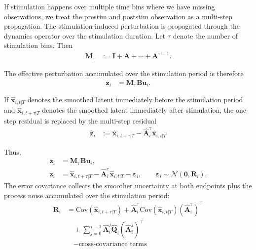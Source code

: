 \documentclass[11pt,letterpaper]{article} %
\begin{document}
If stimulation happens over multiple time bins where we have missing observations, we treat the prestim and poststim observation as a multi-step propagation. The stimulation-induced perturbation is propagated through the dynamics operator over the stimulation duration. Let $\tau$ denote the number of stimulation bins. Then
\begin{align*}
    \bm{M}_{\mathrm{\tau}}
    &:=
    \bm{I}
    + \bm{A}
    + \cdots
    + \bm{A}^{\mathrm{\tau}-1}.
\end{align*}

The effective perturbation accumulated over the stimulation period is therefore
\begin{align*}
    \bm{z}_i
    &=
    \bm{M}_{\mathrm{\tau}}\bm{B}\bm{u}_i.
\end{align*}

If $\hat{\bm{x}}_{i,t|T}$ denotes the smoothed latent immediately before the stimulation period and $\hat{\bm{x}}_{i,t+\tau|T}$ denotes the smoothed latent immediately after stimulation, the one-step residual is replaced by the multi-step residual
\begin{align*}
    \hat{\bm{z}}_i
    &:=
    \hat{\bm{x}}_{i,t+\tau|T}
    -
    \hat{\bm{A}}_i^{\mathrm{\tau}}
    \hat{\bm{x}}_{i,t|T}
\end{align*}

Thus,
\begin{align*}
    \bm{z}_i
    &=
    \bm{M}_{\mathrm{\tau}}\bm{B}\bm{u}_i,
    \\
    \bm{z}_i
    &=
    \hat{\bm{x}}_{i,t+\tau|T}
    -
    \hat{\bm{A}}_i^{\mathrm{\tau}}
    \hat{\bm{x}}_{i,t|T}
    -
    \boldsymbol{\varepsilon}_i,
    \qquad
    \boldsymbol{\varepsilon}_i
    \sim
    \mathcal{N}(\bm{0},\bm{R}_i).
\end{align*}
The error covariance collects the smoother uncertainty at both endpoints plus the process noise accumulated over the stimulation period:
\begin{align*}
    \bm{R}_i
    &=
    \mathrm{Cov}(\hat{\bm{x}}_{i,t+\tau|T})
    +
    \hat{\bm{A}}_i^{\mathrm{\tau}}
    \mathrm{Cov}(\hat{\bm{x}}_{i,t|T})
    \left(\hat{\bm{A}}_i^{\mathrm{\tau}}\right)^\top
    \\
    &\quad
    +
    \sum_{j=0}^{\mathrm{\tau}-1}
    \hat{\bm{A}}_i^j
    \hat{\bm{Q}}_i
    \left(\hat{\bm{A}}_i^j\right)^\top
    \\
    &\quad
    - \text{cross-covariance terms}
\end{align*}
\end{document}

